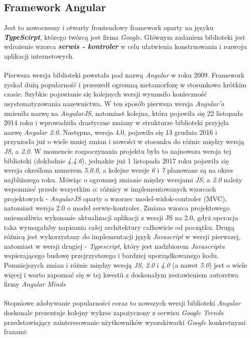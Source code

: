 \subsection{Framework Angular}

\quad Jest to nowoczesny i otwarty frontendowy framework oparty na języku \textbf{\textit{TypeScirpt}}, którego twórcą jest firma \textit{Google}. Głównym zadaniem biblioteki jest wdrożenie wzorca \textit{\textbf{serwis - kontroler}} w celu ułatwienia konstruowania i rozwoju aplikacji internetowych. \\
\\
Pierwsza wersja biblioteki powstała pod nazwą \textit{Angular} w roku 2009. Framework zyskał dużą popularność i przeszedł ogromną metamorfozę w stosunkowo krótkim czasie. Szybkie pojawianie się kolejnych wersji wymusiło konieczność usystematyzowania nazewnictwa. W ten sposób pierwsza wersja \textit{Angular'a} zmieniła nazwę na \textit{AngularJS}, natomiast kolejna, która pojawiła się 22 listopada 2014 roku i wprowadziła drastyczne zmiany w strukturze biblioteki przyjęła nazwę \textit{Angular 2.0}. Następna, wersja 4.0, pojawiła się 13 grudnia 2016 i przyniosła już o wiele mniej zmian i nowości w stosunku do różnic między wersją \textit{JS}, a \textit{2.0}. W momencie rozpoczynania projektu była to najnowsza wersja tej biblioteki (dokładnie \textit{4.4.6}), jednakże już 1 listopada 2017 roku pojawiła się wersja określona numerem \textit{5.0.0}, a kolejne wersje \textit{6} i \textit{7} planowane są na okres najbliższego roku. Mówiąc o ogromnej zmianie między wersjami \textit{JS}, a \textit{2.0} należy wspomnieć przede wszystkim o: różnicy w implementowanych wzorcach projektowych - \textit{AngularJS} oparty o wzorzec model-widok-controler (MVC), natomiast wersja 2.0 o model serwis-kontroler. Zmiana wzorca projektowego uniemożliwia wykonanie aktualizacji aplikacji z wersji JS na 2.0, gdyż operacja taka wymagałaby napisania całej architektury całkowicie od początku. Drugą różnicą jest wykorzystany do implementacji język \textit{Javascript} w wersji pierwszej, natomiast w wersji drugiej - \textit{Typescript}, który jest nadzbiorem \textit{Javascriptu} wspierającego budowę przejrzystszego i bardziej uporządkowanego kodu. Pomniejszych zmian i różnic między wersją \textit{JS}, \textit{2.0} i \textit{4.0} (a nawet \textit{5.0}) jest o wiele więcej i warto zapoznać się w tej kwestii z doskonałym zestawieniem autorstwa firmy \textit{Angular Minds} \cite{angular-comparison}\\
\\
Stopniowe zdobywanie popularności coraz to nowszych wersji biblioteki \textit{Angular} doskonale prezentuje kolejny wykres zapożyczony z serwisu \textit{Google Trends} przedstawiający zainteresowanie użytkowników wyszukiwarki \textit{Google} konkretnymi frazami:
